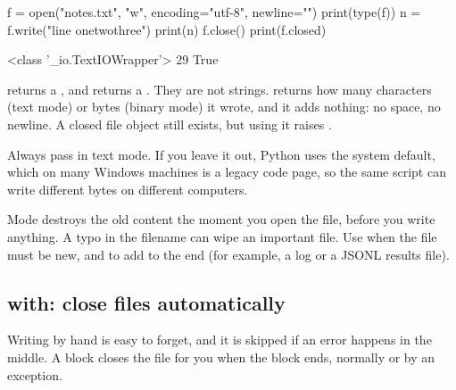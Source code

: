 \begin{pycode}
f = open("notes.txt", "w", encoding="utf-8", newline="\n")
print(type(f))
n = f.write("line one\nline two\nline three\n")
print(n)
f.close()
print(f.closed)
\end{pycode}
\begin{rawcode}
<class '_io.TextIOWrapper'>
29
True
\end{rawcode}

\begin{typecheck}
 returns a , and  returns a
. They are not strings.  returns how many characters (text
mode) or bytes (binary mode) it wrote, and it adds nothing: no space, no newline. A closed
file object still exists, but using it raises .
\end{typecheck}

\begin{gamerule}
Always pass  in text mode. If you leave it out, Python uses the system
default, which on many Windows machines is a legacy code page, so the same script can write
different bytes on different computers.
\end{gamerule}

\begin{trap}
Mode  destroys the old content the moment you open the file, before you write anything.
A typo in the filename can wipe an important file. Use  when the file must be new, and
 to add to the end (for example, a log or a JSONL results file).
\end{trap}

\subsection{with: close files automatically}

Writing  by hand is easy to forget, and it is skipped if an error happens in the
middle. A  block closes the file for you when the block ends, normally or by an
exception.

\begin{center}
\end{center}

